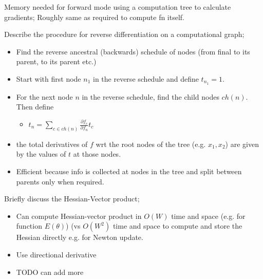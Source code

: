 \documentclass{article}
\begin{document}
Memory needed for forward mode using a computation tree to calculate gradients; Roughly same as required to compute fn itself.

Describe the procedure for reverse differentiation on a computational graph; \begin{itemize}
	\item Find the reverse ancestral (backwards) schedule of nodes (from final to its parent, to its parent etc.)
	\item Start with first node $n_1$ in the reverse schedule and define $t_{n_1}=1$.
	\item For the next node $n$ in the reverse schedule, find the child nodes $ch(n)$. Then define
	\begin{itemize}
		\item $t_n = \sum_{c\in ch(n)}\frac{\partial f_c}{\partial f_n}t_c$
	\end{itemize}
\item the total derivatives of $f$ wrt the root nodes of the tree (e.g. $x_1, x_2$) are given by the values of $t$ at those nodes.
\item Efficient because info is collected at nodes in the tree and split between parents only when required.
\end{itemize}

Briefly discuss the Hessian-Vector product; \begin{itemize}
	\item Can compute Hessian-vector product in $O(W)$ time and space (e.g. for function $E(\theta)$) (vs $O(W^2)$ time and space to compute and store the Hessian directly e.g. for Newton update.
	\item Use directional derivative
	\item TODO can add more
\end{itemize}
\end{document}
